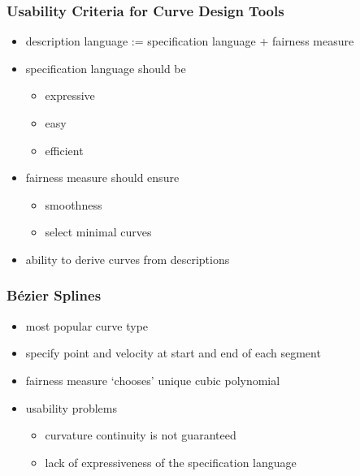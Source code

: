 \documentclass[mathserif]{beamer}
\begin{document}
		\begin{frame}
			\frametitle{Usability Criteria for Curve Design Tools}
			\begin{itemize}
				\item description language := specification language + fairness measure
				\item specification language should be
				\begin{itemize}
					\item expressive
					\item easy
					\item efficient
				\end{itemize}
				\item fairness measure should ensure
				\begin{itemize}
					\item smoothness
					\item select minimal curves
				\end{itemize}
				\item ability to derive curves from descriptions
			\end{itemize}
		\end{frame}

		\begin{frame}
			\frametitle{Bézier Splines}
			\begin{itemize}
				\item most popular curve type
				\item specify point and velocity at start and end of each segment
				\item fairness measure `chooses' unique cubic polynomial
				\item usability problems
				\begin{itemize}
					\item curvature continuity is not guaranteed
					\item lack of expressiveness of the specification language
				\end{itemize}
			\end{itemize}
		\end{frame}
\end{document}
